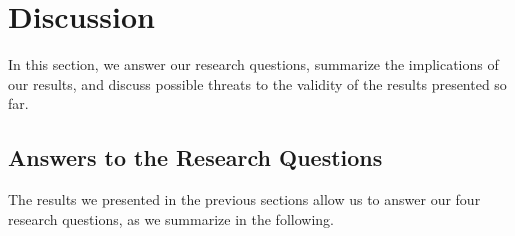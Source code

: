 \section{Discussion}\label{sec:discussion}

In this section, we answer our research questions,
summarize the implications of our results, and discuss possible
threats to the validity of the results presented so far.

\subsection{Answers to the Research Questions}

The results we presented in the previous sections
allow us to answer our four research questions, as
we summarize in the following.


